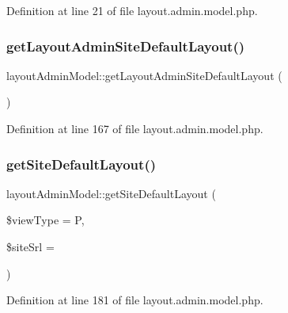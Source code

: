 Definition at line 21 of file layout.\+admin.\+model.\+php.

\hypertarget{classlayoutAdminModel_a1fb703fe8ebe3ced1f904d3a1d645532}{}\label{classlayoutAdminModel_a1fb703fe8ebe3ced1f904d3a1d645532} 
\subsubsection{\texorpdfstring{get\+Layout\+Admin\+Site\+Default\+Layout()}{getLayoutAdminSiteDefaultLayout()}}
{\footnotesize\ttfamily layout\+Admin\+Model\+::get\+Layout\+Admin\+Site\+Default\+Layout (\begin{DoxyParamCaption}{ }\end{DoxyParamCaption})}



Definition at line 167 of file layout.\+admin.\+model.\+php.

\hypertarget{classlayoutAdminModel_a2b457349c237f1db4a9d66449ebff4cb}{}\label{classlayoutAdminModel_a2b457349c237f1db4a9d66449ebff4cb} 
\subsubsection{\texorpdfstring{get\+Site\+Default\+Layout()}{getSiteDefaultLayout()}}
{\footnotesize\ttfamily layout\+Admin\+Model\+::get\+Site\+Default\+Layout (\begin{DoxyParamCaption}\item[{}]{\$view\+Type = {\ttfamily \textquotesingle{}P\textquotesingle{}},  }\item[{}]{\$site\+Srl = {} }\end{DoxyParamCaption})}



Definition at line 181 of file layout.\+admin.\+model.\+php.

\hypertarget{classlayoutAdminModel_aeb0c45993a600a2e3f72bd0a79c3adc7}{}\label{classlayoutAdminModel_aeb0c45993a600a2e3f72bd0a79c3adc7} 
